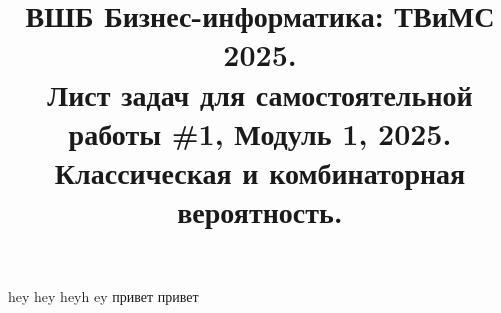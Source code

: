 \documentclass{article}
\title{ВШБ Бизнес-информатика: ТВиМС 2025. \\ Лист задач для самостоятельной работы \#1, Модуль 1, 2025.\\ Классическая и комбинаторная вероятность.}
\date{}
\author{}
\begin{document}
hey hey heyh ey привет привет
\end{document}
